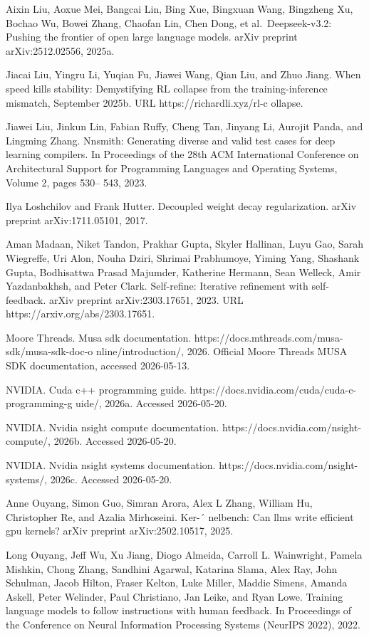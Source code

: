 \documentclass[
  10
]{article}
\begin{document}
Aixin Liu, Aoxue Mei, Bangcai Lin, Bing Xue, Bingxuan Wang, Bingzheng
Xu, Bochao Wu, Bowei Zhang, Chaofan Lin, Chen Dong, et
al.~Deepseek-v3.2: Pushing the frontier of open large language models.
arXiv preprint arXiv:2512.02556, 2025a.

Jiacai Liu, Yingru Li, Yuqian Fu, Jiawei Wang, Qian Liu, and Zhuo Jiang.
When speed kills stability: Demystifying RL collapse from the
training-inference mismatch, September 2025b. URL
https://richardli.xyz/rl-c ollapse.

Jiawei Liu, Jinkun Lin, Fabian Ruffy, Cheng Tan, Jinyang Li, Aurojit
Panda, and Lingming Zhang. Nnsmith: Generating diverse and valid test
cases for deep learning compilers. In Proceedings of the 28th ACM
International Conference on Architectural Support for Programming
Languages and Operating Systems, Volume 2, pages 530-- 543, 2023.

Ilya Loshchilov and Frank Hutter. Decoupled weight decay regularization.
arXiv preprint arXiv:1711.05101, 2017.

Aman Madaan, Niket Tandon, Prakhar Gupta, Skyler Hallinan, Luyu Gao,
Sarah Wiegreffe, Uri Alon, Nouha Dziri, Shrimai Prabhumoye, Yiming Yang,
Shashank Gupta, Bodhisattwa Prasad Majumder, Katherine Hermann, Sean
Welleck, Amir Yazdanbakhsh, and Peter Clark. Self-refine: Iterative
refinement with self-feedback. arXiv preprint arXiv:2303.17651, 2023.
URL https://arxiv.org/abs/2303.17651.

Moore Threads. Musa sdk documentation.
https://docs.mthreads.com/musa-sdk/musa-sdk-doc-o nline/introduction/,
2026. Official Moore Threads MUSA SDK documentation, accessed
2026-05-13.

NVIDIA. Cuda c++ programming guide.
https://docs.nvidia.com/cuda/cuda-c-programming-g uide/, 2026a. Accessed
2026-05-20.

NVIDIA. Nvidia nsight compute documentation.
https://docs.nvidia.com/nsight-compute/, 2026b. Accessed 2026-05-20.

NVIDIA. Nvidia nsight systems documentation.
https://docs.nvidia.com/nsight-systems/, 2026c. Accessed 2026-05-20.

Anne Ouyang, Simon Guo, Simran Arora, Alex L Zhang, William Hu,
Christopher Re, and Azalia Mirhoseini. Ker-´ nelbench: Can llms write
efficient gpu kernels? arXiv preprint arXiv:2502.10517, 2025.

Long Ouyang, Jeff Wu, Xu Jiang, Diogo Almeida, Carroll L. Wainwright,
Pamela Mishkin, Chong Zhang, Sandhini Agarwal, Katarina Slama, Alex Ray,
John Schulman, Jacob Hilton, Fraser Kelton, Luke Miller, Maddie Simens,
Amanda Askell, Peter Welinder, Paul Christiano, Jan Leike, and Ryan
Lowe. Training language models to follow instructions with human
feedback. In Proceedings of the Conference on Neural Information
Processing Systems (NeurIPS 2022), 2022.
\end{document}
